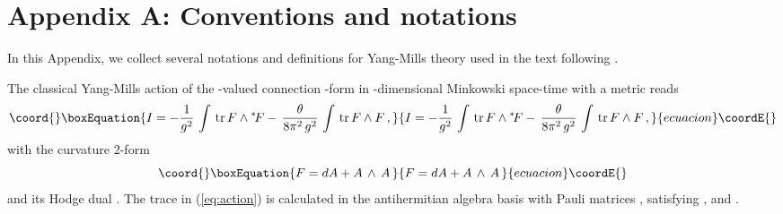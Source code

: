 \documentclass[a4paper,12pt]{article}
\begin{document}

\section*{Appendix A: Conventions and notations}


\label{ap:A}

In this Appendix, we collect several notations and definitions for \coordHE{}
Yang-Mills theory used in the text following \cite{Jackiw}.

The classical Yang-Mills action of the \coordHE{}-valued connection \coordHE{}-form \coordHE{}
in \coordHE{}-dimensional Minkowski space-time with a metric \coordHE{}
reads
\begin{equation}\coord{}\boxEquation{
\label{eq:action}
I  =  - \frac{1}{g^2} \, \int  \, \mbox{tr} \, F \wedge {}^\ast\! F -
\, \frac{\theta}{8\pi^2\,g^2} \, \int \, \mbox{tr} \, F \wedge F \,,
}{
I  =  - \frac{1}{g^2} \, \int  \, \mbox{tr} \, F \wedge {}^\ast\! F -
\, \frac{\theta}{8\pi^2\,g^2} \, \int \, \mbox{tr} \, F \wedge F \,,
}{ecuacion}\coordE{}\end{equation}
with the curvature 2-form
\begin{equation}\coord{}\boxEquation{
F = d A + A \, \wedge\, A\,
}{
F = d A + A \, \wedge\, A\,
}{ecuacion}\coordE{}\end{equation}
and its Hodge dual \coordHE{}.
The trace in (\ref{eq:action}) is calculated in the
antihermitian \coordHE{} algebra basis
\coordHE{} with Pauli matrices \coordHE{},
satisfying \coordHE{}, and
\coordHE{}.
\end{document}
